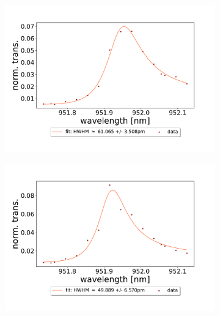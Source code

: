 \begin{figure}[h!]
\begin{subfigure}[b]{0.49\textwidth}
        \includegraphics[width=\textwidth]{figures/results/double fano fits/20250326/453um_M3:M5_fit_5.pdf}
        \caption{}
        \label{fig:453um_M3:M5_fit_5}
    \end{subfigure}
    \begin{subfigure}[b]{0.49\textwidth}
        \includegraphics[width=\textwidth]{figures/results/double fano fits/20250326/453um_M3:M5_fit_6.pdf}
        \caption{}
        \label{fig:453um_M3:M5_fit_6}
    \end{subfigure}
\end{figure}
